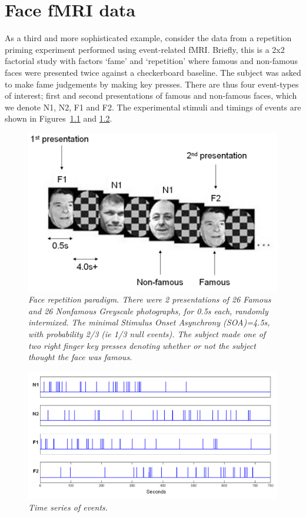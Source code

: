 \documentclass[a4paper,titlepage]{book}
\begin{document}
\chapter{Face fMRI data}

As a third and more sophisticated example, consider the data from a repetition priming experiment performed using event-related fMRI. Briefly, this is a 2x2 factorial study with factors `fame' and `repetition' where famous and non-famous faces were presented twice against a checkerboard baseline. The subject was asked to make fame judgements by making key presses. There are thus four event-types of interest; first and second presentations of famous and non-famous faces, which 
we denote N1, N2, F1 and F2. The experimental stimuli and timings of events are shown in Figures~\ref{face_stim} and \ref{face_timing}.
\begin{figure}
\begin{center}
\includegraphics[width=120mm]{face_stim}
\caption{\em Face repetition paradigm.  There were 2 presentations of 26 Famous and 26 Nonfamous Greyscale photographs, for 0.5s each, randomly intermixed. The 
minimal Stimulus Onset Asynchrony (SOA)=4.5s, with probability 2/3 (ie 1/3 null events). The subject made one of two 
right finger key presses denoting whether or not the subject thought the face was famous. \label{face_stim}}
\end{center}
\end{figure}
\begin{figure}
\begin{center}
\includegraphics[width=120mm]{face_timing}
\caption{\em Time series of events. \label{face_timing}}
\end{center}
\end{figure}
\end{document}
